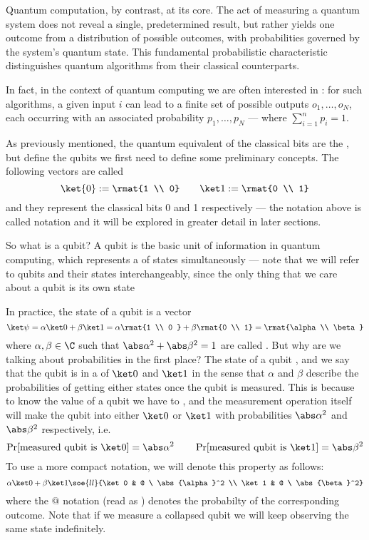 \documentclass[a4paper, 12pt]{report}
\begin{document}
Quantum computation, by contrast,  at its core. The act of measuring a quantum system does not reveal a single, predetermined result, but rather yields one outcome from a distribution of possible outcomes, with probabilities governed by the system's quantum state. This fundamental probabilistic characteristic distinguishes quantum algorithms from their classical counterparts.

In fact, in the context of quantum computing we are often interested in : for such algorithms, a given input $i$ can lead to a finite set of possible outputs $o_1, \ldots, o_N$, each occurring with an associated probability $p_1, \ldots, p_N$ --- where $\sum_{i = 1}^n{p_i} = 1$.

As previously mentioned, the quantum equivalent of the classical bits are the , but define the qubits we first need to define some preliminary concepts. The following vectors are called  $$\ket{0} := \rmat{1 \\ 0} \quad \quad \ket 1 := \rmat{0 \\ 1}$$ and they represent the classical bits 0 and 1 respectively --- the notation above is called  notation and it will be explored in greater detail in later sections.

So what is a qubit? A qubit is the basic unit of information in quantum computing, which represents a  of states simultaneously --- note that we will refer to qubits and their states interchangeably, since the only thing that we care about a qubit is its own state

In practice, the state of a qubit is a vector $$\ket \psi = \alpha \ket 0 + \beta \ket 1 = \alpha \rmat{1 \\ 0 } + \beta \rmat{0 \\ 1} = \rmat{\alpha \\ \beta}$$ where $\alpha, \beta \in \C$ such that $\abs \alpha ^2 + \abs \beta ^2 = 1$ are called . But why are we talking about probabilities in the first place? The  state of a qubit , and we say that the qubit is in a  of $\ket 0$ and $\ket 1$ in the sense that $\alpha$ and $\beta$ describe the probabilities of getting either states once the qubit is measured. This is because to know the value of a qubit we have to , and the measurement operation itself will make the qubit  into either $\ket 0$ or $\ket 1$ with probabilities $\abs \alpha ^2$ and $\abs \beta ^2$ respectively, i.e. $$\Pr[\mbox{measured qubit is $\ket 0$}] = \abs \alpha ^2 \quad \quad \Pr[\mbox{measured qubit is $\ket 1$}] = \abs \beta ^2$$ To use a more compact notation, we will denote this property as follows: $$\alpha \ket 0 + \beta \ket 1 \soe{ll}{\ket 0 & @ \  \abs{\alpha}^2 \\ \ket 1 & @ \ \abs{\beta}^2}$$ where the $@$ notation (read as ) denotes the probabilty of the corresponding outcome. Note that if we measure a collapsed qubit we will keep observing the same state indefinitely.
\end{document}
